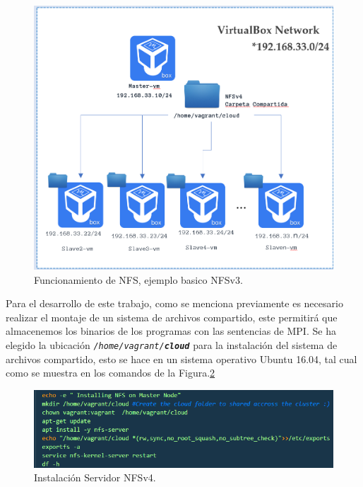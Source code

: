 \documentclass[letterpaper, 12pt, oneside]{article}
\begin{document}
    \begin{figure}[H]
    \includegraphics[scale=1]{img/nfs/nfs2.png}
    \caption{Funcionamiento de NFS, ejemplo basico NFSv3.}
        \label{fig:net3}
    \end{figure}
    
    Para el desarrollo de este trabajo, como se menciona previamente es necesario realizar el montaje de un sistema de archivos compartido, este permitirá que almacenemos los binarios de los programas con las sentencias de MPI. Se ha elegido la ubicación \texttt{\textit{\//home/vagrant/\textbf{cloud}}} para la instalación del sistema de archivos compartido, esto se hace en un sistema operativo Ubuntu 16.04, tal cual como se muestra en los comandos de la Figura.\ref{fig:nfsserver}
      \begin{figure}[H]
            \includegraphics[scale=1.8]{img/nfs/installnfs.png}
            \caption{Instalación Servidor NFSv4.}
            \label{fig:nfsserver}
    \end{figure}
    
\end{document}
